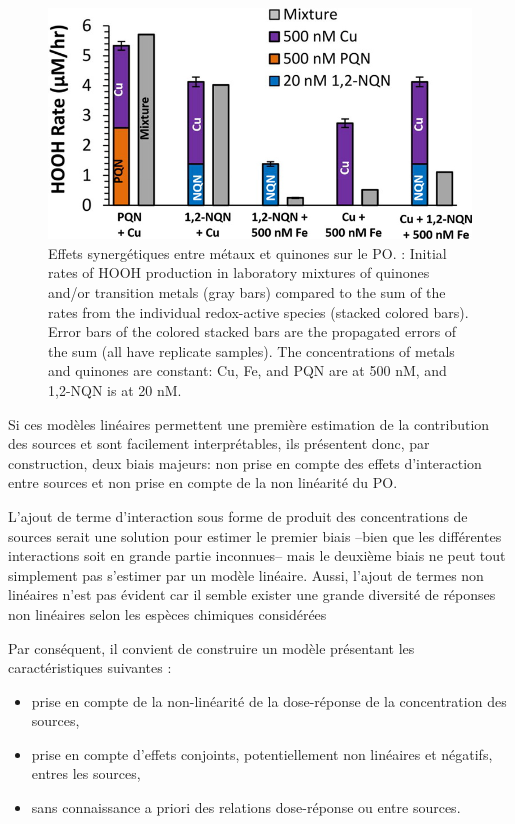 \begin{figure}[ht]
    \centering
    \includegraphics[width=0.5\linewidth]{figures/chapter05/charrier_hydrogen_2014_fig4.jpg}
    \caption[Effets synergétiques entre métaux et quinones sur le PO]{Effets
        synergétiques entre métaux et quinones sur le PO. \cite[figure 4]{charrierHydrogen2014}: Initial rates of HOOH production in
    laboratory mixtures of quinones and/or transition metals (gray bars) compared to the
    sum of the rates from the individual redox-active species (stacked colored bars). Error
    bars of the colored stacked bars are the propagated errors of the sum (all have replicate
    samples). The concentrations of metals and quinones are constant: Cu, Fe, and PQN are at
    500 nM, and 1,2-NQN is at 20 nM.}%
    \label{fig:charrier_hydrogen_2014_fig4}
\end{figure}

Si ces modèles linéaires permettent une première estimation de la contribution des sources et sont
facilement interprétables, ils présentent donc, par construction, deux biais majeurs: non
prise en compte des effets d'interaction entre sources et non prise en compte de la non
linéarité du PO.

L'ajout de terme d'interaction sous forme de produit des concentrations de sources serait
une solution pour estimer le premier biais --bien que les différentes interactions soit en grande partie inconnues--
mais le deuxième biais ne peut tout simplement
pas s'estimer par un modèle linéaire. Aussi, l'ajout de termes non linéaires n'est pas
évident car il semble exister une grande diversité de réponses non linéaires selon les
espèces chimiques
considérées~\autocite{charrierDithiothreitol2012,charrierBias2016,calasImportance2017}

Par conséquent, il convient de construire un modèle présentant les caractéristiques
suivantes :
\begin{itemize}
    \item prise en compte de la non-linéarité de la dose-réponse de la concentration des
        sources,
    \item prise en compte d'effets conjoints, potentiellement non linéaires et négatifs,
        entres les sources,
    \item sans connaissance a priori des relations dose-réponse ou entre sources.
\end{itemize}

